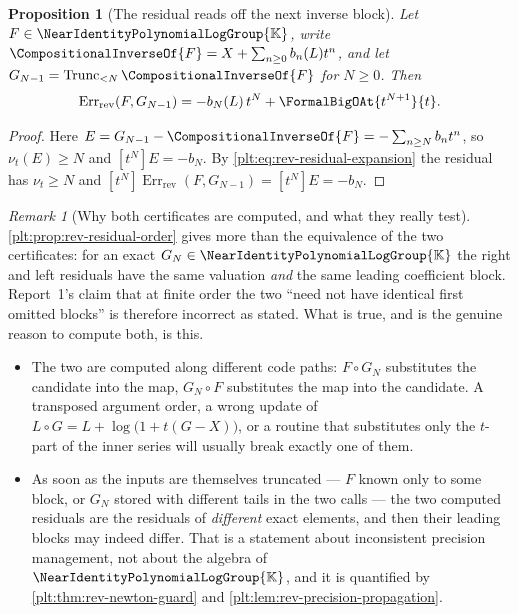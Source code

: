\documentclass[11pt,oneside]{article}
\theoremstyle{plain}
\newtheorem{proposition}[theorem]{Proposition}
\theoremstyle{definition}
\theoremstyle{remark}
\newtheorem{remark}[theorem]{Remark}
\newcommand{\K}{\mathbb{K}}
\newcommand{\Gnear}{\NearIdentityPolynomialLogGroup{\K}} %
\newcommand{\ordt}{\nu_{t}}                              %
\newcommand{\Trunc}[2]{\operatorname{Trunc}_{<#2}#1}     %
\newcommand{\compose}{\mathbin{\circ}}
\newcommand{\rev}[1]{\CompositionalInverseOf{#1}}
\newcommand{\RevErr}[2]{\operatorname{Err}_{\mathrm{rev}}\!\left(#1,#2\right)}
\begin{document}
\begin{proposition}[The residual reads off the next inverse block]
\label{plt:prop:rev-next-block}
Let \(F\in\Gnear\), write \(\rev{F}=X+\sum_{n\ge0}b_n(L)t^n\), and let
\(G_{N-1}=\Trunc{\rev{F}}{N}\) for \(N\ge0\).  Then
\begin{equation}\label{plt:eq:rev-next-block}
 \RevErr{F}{G_{N-1}}=-b_N(L)\,t^N+\FormalBigOAt{t^{N+1}}{t}.
\end{equation}
\end{proposition}

\begin{proof}
Here \(E=G_{N-1}-\rev{F}=-\sum_{n\ge N}b_nt^n\), so \(\ordt(E)\ge N\) and
\([t^N]E=-b_N\).  By \eqref{plt:eq:rev-residual-expansion} the residual has
\(\ordt\ge N\) and \([t^N]\RevErr{F}{G_{N-1}}=[t^N]E=-b_N\).
\end{proof}

\begin{remark}[Why both certificates are computed, and what they really test]
\label{plt:rmk:rev-two-certificates}
\cref{plt:prop:rev-residual-order} gives more than the equivalence of the two
certificates: for an exact \(G_N\in\Gnear\) the right and left residuals have
the same valuation \emph{and} the same leading coefficient block.  Report~1's
claim that at finite order the two ``need not have identical first omitted
blocks'' is therefore incorrect as stated.  What is true, and is the genuine
reason to compute both, is this.
\begin{itemize}
\item The two are computed along different code paths: \(F\compose G_N\)
substitutes the candidate into the map, \(G_N\compose F\) substitutes the map
into the candidate.  A transposed argument order, a wrong update of
\(L\compose G=L+\log\bigl(1+t(G-X)\bigr)\), or a routine that substitutes only
the \(t\)-part of the inner series will usually break exactly one of them.
\item As soon as the inputs are themselves truncated --- \(F\) known only to
some block, or \(G_N\) stored with different tails in the two calls --- the two
computed residuals are the residuals of \emph{different} exact elements, and
then their leading blocks may indeed differ.  That is a statement about
inconsistent precision management, not about the algebra of \(\Gnear\), and it
is quantified by \cref{plt:thm:rev-newton-guard} and
\cref{plt:lem:rev-precision-propagation}.
\end{itemize}
\end{remark}
\end{document}
